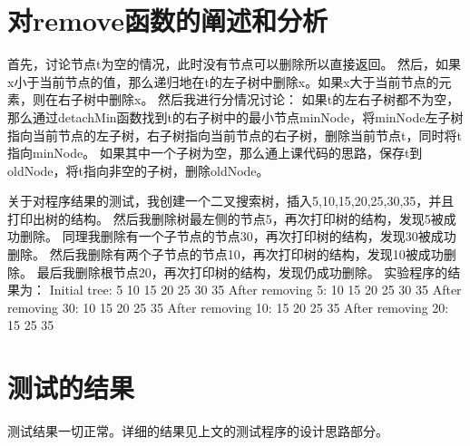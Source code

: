 \documentclass[UTF8]{ctexart}
\begin{document}
\pagestyle{fancy}
\fancyhead{}

\section{对remove函数的阐述和分析}
首先，讨论节点t为空的情况，此时没有节点可以删除所以直接返回。
然后，如果x小于当前节点的值，那么递归地在t的左子树中删除x。如果x大于当前节点的元素，则在右子树中删除x。
然后我进行分情况讨论：
如果t的左右子树都不为空，那么通过detachMin函数找到t的右子树中的最小节点minNode，将minNode左子树
指向当前节点的左子树，右子树指向当前节点的右子树，删除当前节点t，同时将t指向minNode。
如果其中一个子树为空，那么通上课代码的思路，保存t到oldNode，将t指向非空的子树，删除oldNode。

关于对程序结果的测试，我创建一个二叉搜索树，插入5,10,15,20,25,30,35，并且打印出树的结构。
然后我删除树最左侧的节点5，再次打印树的结构，发现5被成功删除。
同理我删除有一个子节点的节点30，再次打印树的结构，发现30被成功删除。
然后我删除有两个子节点的节点10，再次打印树的结构，发现10被成功删除。
最后我删除根节点20，再次打印树的结构，发现仍成功删除。
实验程序的结果为：
Initial tree:
5
10
15
20
25
30
35
After removing 5:
10
15
20
25
30
35
After removing 30:
10
15
20
25
35
After removing 10:
15
20
25
35
After removing 20:
15
25
35

\section{测试的结果}

测试结果一切正常。详细的结果见上文的测试程序的设计思路部分。
\end{document}
